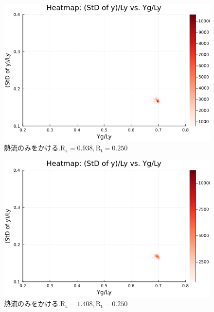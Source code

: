 \begin{figure}[H]
  \centering
  \includegraphics[scale=0.6]{image/g0_heat/2024-01-15T14:07:35.361_mapg0_chiinf_Ay50_rho0.4_T0.43_dT0.04_Rd0.0_Rt0.25_Ra0.938769_g0_run4.0e7.png}
  \caption{$熱流のみをかける. \text{R}_\text{a}=0.938,\text{R}_\text{t}=0.250$}
  \label{}
\end{figure}

\begin{figure}[H]
  \centering
  \includegraphics[scale=0.6]{image/g0_heat/2024-01-15T14:07:35.445_mapg0_chiinf_Ay50_rho0.4_T0.43_dT0.04_Rd0.0_Rt0.25_Ra1.4081535_g0_run4.0e7.png}
  \caption{$熱流のみをかける. \text{R}_\text{a}=1.408,\text{R}_\text{t}=0.250$}
  \label{}
\end{figure}

